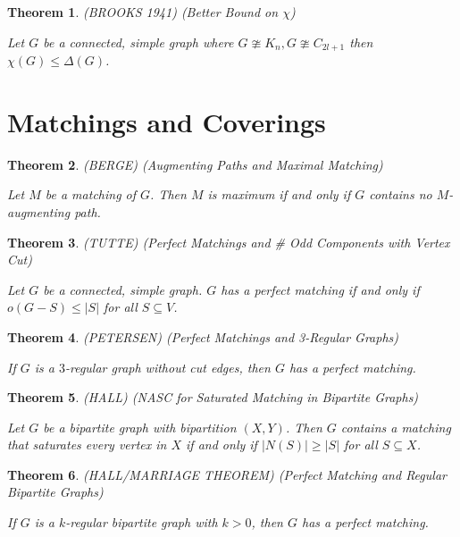\documentclass[12pt]{amsart}
\newtheorem{thm}{Theorem}
\theoremstyle{definition}
\begin{document}
\begin{thm} (BROOKS 1941) (Better Bound on $\chi$)

Let $G$ be a connected, simple graph where $G\ncong K_n, G\ncong C_{2l+1}$ then $\chi(G)\leq \Delta(G)$.
\end{thm}


\section{Matchings and Coverings}

\begin{thm} (BERGE) (Augmenting Paths and Maximal Matching)

Let $M$ be a matching of $G$. Then $M$ is maximum if and only if $G$ contains no $M$-augmenting path.
\end{thm}


\begin{thm} (TUTTE) (Perfect Matchings and \# Odd Components with Vertex Cut)

Let $G$ be a connected, simple graph. $G$ has a perfect matching if and only if $o(G-S) \leq |S|$ for all $S \subseteq V$.
\end{thm}


\begin{thm} (PETERSEN) (Perfect Matchings and 3-Regular Graphs)

If $G$ is a $3$-regular graph without cut edges, then $G$ has a perfect matching.
\end{thm}


\begin{thm} (HALL) (NASC for Saturated Matching in Bipartite Graphs)

Let $G$ be a bipartite graph with bipartition $(X,Y)$. Then $G$ contains a matching that saturates
every vertex in $X$ if and only if $|N(S)| \geq |S|$ for all $S \subseteq X$.
\end{thm}


\begin{thm} (HALL/MARRIAGE THEOREM) (Perfect Matching and Regular Bipartite Graphs)

If $G$ is a $k$-regular bipartite graph with $k > 0$, then $G$ has a perfect matching.
\end{thm}
\end{document}
